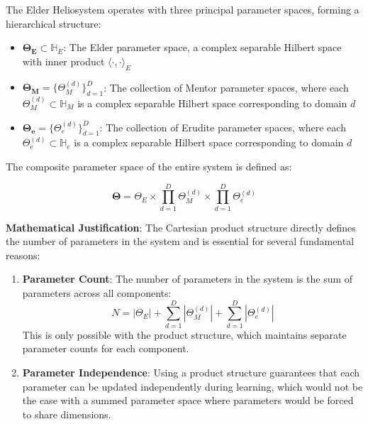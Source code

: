 \begin{definition}
The Elder Heliosystem operates with three principal parameter spaces, forming a hierarchical structure:

\begin{itemize}
    \item $\boldsymbol{\Theta_E} \subset \mathbb{H}_E$: The Elder parameter space, a complex separable Hilbert space with inner product $\langle \cdot, \cdot \rangle_E$
    
    \item $\boldsymbol{\Theta_M} = \{\Theta_M^{(d)}\}_{d=1}^D$: The collection of Mentor parameter spaces, where each $\Theta_M^{(d)} \subset \mathbb{H}_M$ is a complex separable Hilbert space corresponding to domain $d$
    
    \item $\boldsymbol{\Theta_e} = \{\Theta_e^{(d)}\}_{d=1}^D$: The collection of Erudite parameter spaces, where each $\Theta_e^{(d)} \subset \mathbb{H}_e$ is a complex separable Hilbert space corresponding to domain $d$
\end{itemize}

The composite parameter space of the entire system is defined as:

\begin{equation}
\boldsymbol{\Theta} = \Theta_E \times \prod_{d=1}^D \Theta_M^{(d)} \times \prod_{d=1}^D \Theta_e^{(d)}
\end{equation}

\textbf{Mathematical Justification}: The Cartesian product structure directly defines the number of parameters in the system and is essential for several fundamental reasons:
\begin{enumerate}
    \item \textbf{Parameter Count}: The number of parameters in the system is the sum of parameters across all components:
    \begin{equation}
    N = |\Theta_E| + \sum_{d=1}^D |\Theta_M^{(d)}| + \sum_{d=1}^D |\Theta_e^{(d)}|
    \end{equation}
    This is only possible with the product structure, which maintains separate parameter counts for each component.
    
    \item \textbf{Parameter Independence}: Using a product structure guarantees that each parameter can be updated independently during learning, which would not be the case with a summed parameter space where parameters would be forced to share dimensions.
    

\end{enumerate}
\end{definition}
